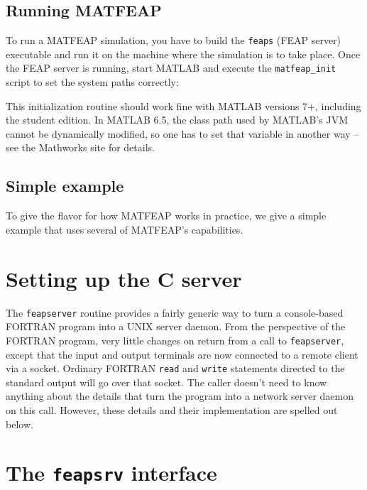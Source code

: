 \documentclass{report}
\begin{document}
\section{Running MATFEAP}

To run a MATFEAP simulation, you have to build the {\tt feaps} (FEAP
server) executable and run it on the machine where the simulation is
to take place.  Once the FEAP server is running, start MATLAB and
execute the {\tt matfeap\_init} script to set the system paths
correctly:


This initialization routine should work fine with MATLAB versions 7+,
including the student edition.  In MATLAB 6.5, the class path used by
MATLAB's JVM cannot be dynamically modified, so one has to set that
variable in another way -- see the Mathworks site for details.


\section{Simple example}

To give the flavor for how MATFEAP works in practice, we give a simple
example that uses several of MATFEAP's capabilities.




\chapter{Setting up the C server}

The {\tt feapserver} routine provides a fairly generic way to turn a
console-based FORTRAN program into a UNIX server daemon.  From the
perspective of the FORTRAN program, very little changes on return from
a call to {\tt feapserver}, except that the input and output terminals
are now connected to a remote client via a socket.  Ordinary FORTRAN
{\tt read} and {\tt write} statements directed to the standard output
will go over that socket.  The caller doesn't need to know anything about
the details that turn the program into a network server daemon on this
call.  However, these details and their implementation are spelled out
below.




\chapter{The {\tt feapsrv} interface}
\end{document}
